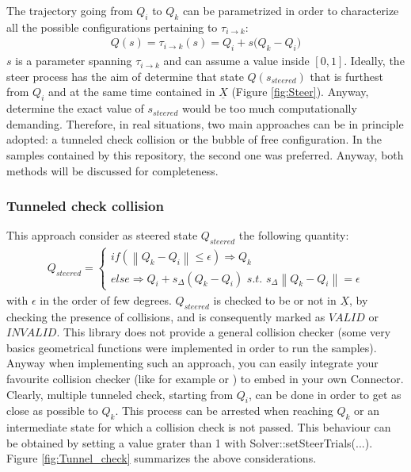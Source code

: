 The trajectory going from $Q_i$ to $Q_k$ can be parametrized in order to characterize all the possible configurations pertaining to $\tau_{i \rightarrow k}$:
\begin{eqnarray}
 Q(s) = \tau_{i \rightarrow k}(s) = Q_i + s \bigg ( Q_k - Q_i \bigg )
\label{eq:Q_composite}
\end{eqnarray}
$s$ is a parameter spanning $\tau_{i \rightarrow k}$ and can assume a value inside $[0,1]$.
Ideally, the steer process has the aim of determine that state $Q(s_{steered})$ that is furthest from $Q_i$ and at the same time contained in $\underline{X}$ (Figure \ref{fig:Steer}). Anyway, determine the exact value of $s_{steered}$ would be too much computationally demanding. Therefore, in real situations, two main approaches can be in principle adopted: a tunneled check collision or the bubble of free configuration.
In the samples contained by this repository, the second one was preferred. Anyway, both methods will be discussed for completeness.

\subsubsection{Tunneled check collision}
\label{sec:tunneled_check}

This approach consider as steered state $Q_{steered}$ the following quantity:
\begin{eqnarray}
Q_{steered} = \left\{\begin{matrix}
\textit{if} (\left \| Q_k - Q_i \right \| \leq \epsilon) \Rightarrow Q_k 
\\ 
\textit{else} \Rightarrow Q_i + s_{\Delta} ( Q_k - Q_i ) \textit{   s.t.   } s_{\Delta} \left \| Q_k - Q_i  \right \| = \epsilon
\end{matrix}\right.
\end{eqnarray}
with $\epsilon$ in the order of few degrees. $Q_{steered}$ is checked to be or not in $\underline{X}$, by checking the presence of collisions, and is consequently marked as $VALID$ or $INVALID$. 
This library does not provide a general collision checker (some very basics geometrical functions were implemented in order to run the samples). Anyway when implementing such an approach, you can easily integrate your favourite collision checker (like for example \cite{Bullet} or \cite{React}) to embed in your own Connector.
\\
Clearly, multiple tunneled check, starting from $Q_i$, can be done in order to get as close as possible to $Q_k$. This process can be arrested when reaching $Q_k$ or an intermediate state for which a collision check is not passed. This behaviour can be obtained by setting a value grater than 1 with Solver::setSteerTrials(...).
\\
Figure \ref{fig:Tunnel_check} summarizes the above considerations.


